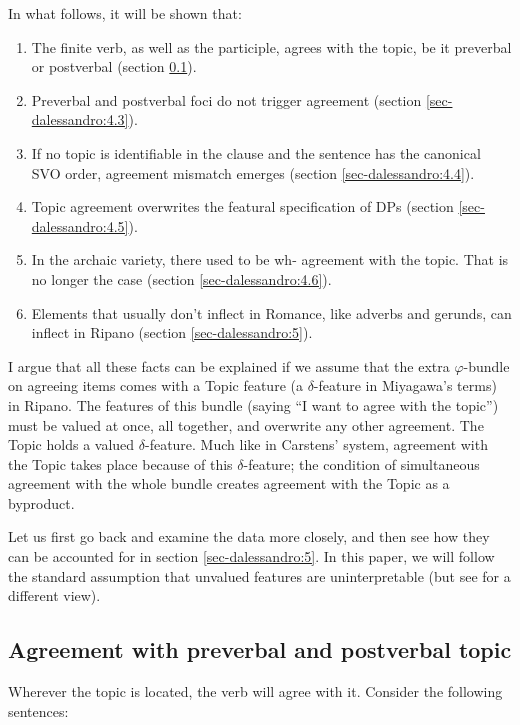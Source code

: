 \documentclass[output=paper
,modfonts
,nonflat]{langsci/langscibook}
\begin{document}
In what follows, it will be shown that:

\begin{enumerate}
\item[1.]The finite verb, as well as the participle, agrees with the topic, be it preverbal or postverbal (section \ref{sec-dalessandro:4.2}).
\item[2.]Preverbal and postverbal foci do not trigger agreement (section \ref{sec-dalessandro:4.3}).
\item[3.]If no topic is identifiable in the clause and the sentence has the canonical SVO order, agreement mismatch emerges (section \ref{sec-dalessandro:4.4}).
\item[4.]Topic agreement overwrites the featural specification of DPs (section \ref{sec-dalessandro:4.5}).
\item[5.]In the archaic variety, there used to be wh- agreement with the topic. That is no longer the case (section \ref{sec-dalessandro:4.6}).
\item[6.]Elements that usually don’t inflect in Romance, like adverbs and gerunds, can inflect in Ripano (section \ref{sec-dalessandro:5}).
\end{enumerate}
I argue that all these facts can be explained if we assume that the extra $\varphi $-bundle on agreeing items comes with a Topic feature (a $\delta $-feature in Miyagawa’s terms) in Ripano. The features of this bundle (saying “I want to agree with the topic”) must be valued at once, all together, and overwrite any other agreement. The Topic holds a valued $\delta $-feature. Much like in Carstens’ system, agreement with the Topic takes place because of this $\delta $-feature; the condition of simultaneous agreement with the whole bundle creates agreement with the Topic as a byproduct.

\noindent Let us first go back and examine the data more closely, and then see how they can be accounted for in section \ref{sec-dalessandro:5}. In this paper, we will follow the standard assumption that unvalued features are uninterpretable (but see  \citealt{Pesetsky_Torrego2007} for a different view). 

\subsection{Agreement with preverbal and postverbal topic}\label{sec-dalessandro:4.2}
Wherever the topic is located, the verb will agree with it. Consider the following sentences: 
\end{document}
